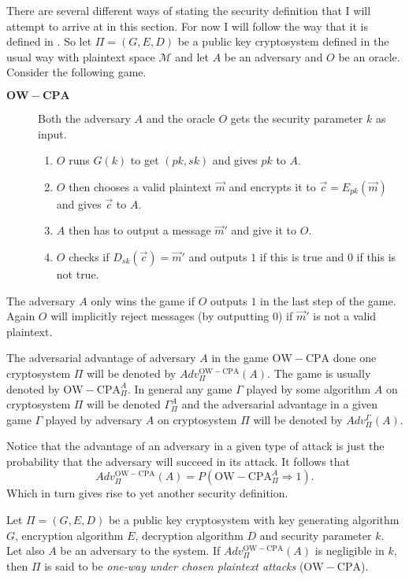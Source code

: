 There are several different ways of stating the security definition that I will attempt to arrive at in this section. For now I will follow the way that it is defined in \cite{HHK}. So let $\Pi = \left(G,E,D\right)$ be a public key cryptosystem defined in the usual way with plaintext space $\mathcal{M}$ and let $A$ be an adversary and $O$ be an oracle. Consider the following game.
\begin{description}
	\item[$\mathrm{\mathbf{OW-CPA}}$] Both the adversary $A$ and the oracle $O$ gets the security parameter $k$ as input.
	\begin{enumerate}
		\item $O$ runs $G\left(k\right)$ to get $\left(pk,sk\right)$ and gives $pk$ to $A$.
		\item $O$ then chooses a valid plaintext $\vec{m}$ and encrypts it to $\vec{c} = E_{pk}\left(\vec{m}\right)$ and gives $\vec{c}$ to $A$.
		\item $A$ then has to output a message $\vec{m}'$ and give it to $O$.
		\item $O$ checks if $D_{sk}\left(\vec{c}\right) = \vec{m}'$ and outputs $1$ if this is true and $0$ if this is not true.
	\end{enumerate}
\end{description}
The adversary $A$ only wins the game if $O$ outputs $1$ in the last step of the game. Again $O$ will implicitly reject messages (by outputting $0$) if $\vec{m}'$ is not a valid plaintext.

The adversarial advantage of adversary $A$ in the game $\mathrm{OW-CPA}$ done one cryptosystem $\Pi$ will be denoted by $Adv_{\Pi}^{\mathrm{OW-CPA}}\left(A\right)$. The game is usually denoted by $\mathrm{OW-CPA}^A_{\Pi}$. In general any game $\Gamma$ played by some algorithm $A$ on cryptosystem $\Pi$ will be denoted $\Gamma_{\Pi}^A$ and the adversarial advantage in a given game $\Gamma$ played by adversary $A$ on cryptosystem $\Pi$ will be denoted by $Adv_{\Pi}^{\Gamma}\left(A\right)$.

Notice that the advantage of an adversary in a given type of attack is just the probability that the adversary will succeed in its attack. It follows that
\[
	Adv_{\Pi}^{\mathrm{OW-CPA}}\left(A\right) = P\left( \mathrm{OW-CPA}^A_{\Pi} \Rightarrow 1 \right) .
\]
Which in turn gives rise to yet another security definition.
\begin{defi}
	Let $\Pi = \left(G,E,D\right)$ be a public key cryptosystem with key generating algorithm $G$, encryption algorithm $E$, decryption algorithm $D$ and security parameter $k$. Let also $A$ be an adversary to the system. If $Adv_{\Pi}^{\mathrm{OW-CPA}}\left(A\right)$ is negligible in $k$, then $\Pi$ is said to be \emph{one-way under chosen plaintext attacks} (\emph{$\mathrm{OW-CPA}$}).
\end{defi}



